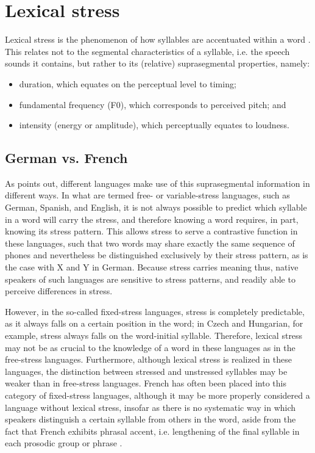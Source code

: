 	
 \section{Lexical stress}
 \label{sec:bkgd:stress}
			Lexical stress is the phenomenon of how syllables are accentuated within a word  \citep{Cutler2005}. This relates not to the segmental characteristics of a syllable, i.e. the speech sounds it contains, but rather to its (relative) suprasegmental properties, namely: %
			\begin{itemize}
			\item duration, which equates on the perceptual level to timing;
			\item fundamental frequency (F0), which corresponds to perceived pitch; and
			\item intensity (energy or amplitude), which perceptually equates to loudness.
			\end{itemize}

		
		\subsection{German vs. French}
		\label{sec:stress:GvF}
		
					As \textcite{Cutler2005} points out, different languages make use of this suprasegmental information in different ways. 
			In what are termed free- or variable-stress languages, such as German, Spanish, and English, it is not always possible to predict which syllable in a word will carry the stress, and therefore knowing a word requires, in part, knowing its stress pattern. This allows stress to serve a contrastive function in these languages, such that two words may share exactly the same sequence of phones and nevertheless be distinguished exclusively by their stress pattern, as is the case with X and Y in German. %
Because stress carries meaning thus, native speakers of such languages are sensitive to stress patterns, and readily able to perceive differences in stress. %

			However, in the so-called fixed-stress languages, stress is completely predictable, as it always falls on a certain position in the word; in Czech and Hungarian, for example, stress always falls on the word-initial syllable. Therefore, lexical stress may not be as crucial to the knowledge of a word in these languages as in the free-stress languages. Furthermore, although lexical stress is realized in these languages, the distinction between stressed and unstressed syllables may be weaker than in free-stress languages. French has often been placed into this category of fixed-stress languages, although it may be more properly considered a language without lexical stress, insofar as there is no systematic way in which speakers distinguish a certain syllable from others in the word, aside from the fact that French exhibits phrasal accent, i.e. lengthening of the final syllable in each prosodic group or phrase \citep{Dupoux2008}. %
			
